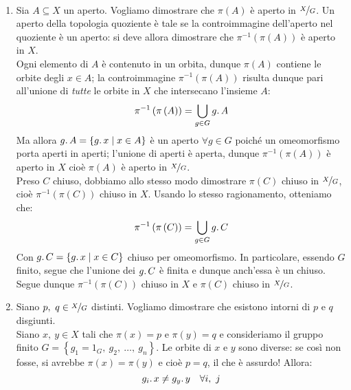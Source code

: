\begin{demonstration}~{}
\begin{enumerate}[label=\Roman*]
\item Sia $A\subseteq X$ un aperto. Vogliamo dimostrare che $\pi\left(A\right)$ è aperto in $\nicefrac{X}{G}$. Un aperto della topologia quoziente è tale se la controimmagine dell'aperto nel quoziente è un aperto: si deve allora dimostrare che $\pi^{-1}\left(\pi\left(A\right)\right)$ è aperto in $X$.\\
Ogni elemento di $A$ è contenuto in un orbita, dunque $\pi\left(A\right)$ contiene le orbite degli $x\in A$; la controimmagine $\pi^{-1}\left(\pi\left(A\right)\right)$ risulta dunque pari all'unione di \textit{tutte} le orbite in $X$ che intersecano l'insieme $A$:
\begin{equation*}
\pi^{-1}\left(\pi\left(A\right)\right)=\mathop{{\bigcup}}\displaylimits_{g\in G} g\ldotp A
\end{equation*}
Ma allora $g\ldotp A=\left\{g\ldotp x\mid x\in A\right\}$ è un aperto $\forall g\in G$ poiché un omeomorfismo porta aperti in aperti; l'unione di aperti è aperta, dunque $\pi^{-1}\left(\pi\left(A\right)\right)$ è aperto in $X$ cioè $\pi\left(A\right)$ è aperto in $\nicefrac{X}{G}$.\\
Preso $C$ chiuso, dobbiamo allo stesso modo dimostrare $\pi\left(C\right)$ chiuso in $\nicefrac{X}{G}$, cioè $\pi^{-1}\left(\pi\left(C\right)\right)$ chiuso in $X$. Usando lo stesso ragionamento, otteniamo che:
\begin{equation*}
	\pi^{-1}\left(\pi\left(C\right)\right)=\mathop{{\bigcup}}\displaylimits_{g\in G} g\ldotp C
\end{equation*}
Con $g\ldotp C=\left\{g\ldotp x\mid x\in C\right\}$ chiuso per omeomorfismo. In particolare, essendo $G$ finito, segue che l'unione dei $g\ldotp C$ è finita e dunque anch'essa è un chiuso. Segue dunque $\pi^{-1}\left(\pi\left(C\right)\right)$ chiuso in $X$ e $\pi\left(C\right)$ chiuso in $\nicefrac{X}{G}$.
\item Siano $p,\ q\in \nicefrac{X}{G}$ distinti. Vogliamo dimostrare che esistono intorni di $p$ e $q$ disgiunti.\\
Siano $x,\ y\in X$ tali che $\pi\left(x\right)=p$ e $\pi\left(y\right)=q$ e consideriamo il gruppo finito $G=\left\{g_1=1_G,\ g_2,\ \ldots,\ g_n\right\}$. Le orbite di $x$ e $y$ sono diverse: se così non fosse, si avrebbe $\pi\left(x\right)=\pi\left(y\right)$ e cioè $p=q$, il che è assurdo! Allora:
\begin{equation*}
g_i\ldotp x\neq g_y\ldotp y\quad \forall i,\ j
\end{equation*}

\end{enumerate}
\end{demonstration}
